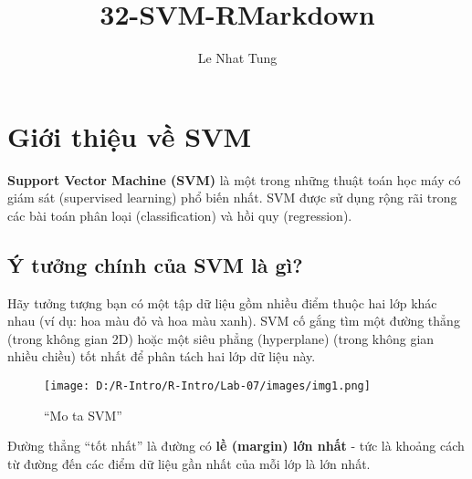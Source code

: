 \documentclass[
]{article}
\title{32-SVM-RMarkdown}
\author{Le Nhat Tung}
\date{}
\begin{document}
\maketitle

\section{Giới thiệu về SVM}\label{giux1edbi-thiux1ec7u-vux1ec1-svm}

\textbf{Support Vector Machine (SVM)} là một trong những thuật toán học
máy có giám sát (supervised learning) phổ biến nhất. SVM được sử dụng
rộng rãi trong các bài toán phân loại (classification) và hồi quy
(regression).

\subsection{Ý tưởng chính của SVM là
gì?}\label{uxfd-tux1b0ux1edfng-chuxednh-cux1ee7a-svm-luxe0-guxec}

Hãy tưởng tượng bạn có một tập dữ liệu gồm nhiều điểm thuộc hai lớp khác
nhau (ví dụ: hoa màu đỏ và hoa màu xanh). SVM cố gắng tìm một đường
thẳng (trong không gian 2D) hoặc một siêu phẳng (hyperplane) (trong
không gian nhiều chiều) tốt nhất để phân tách hai lớp dữ liệu này.

\begin{figure}
\centering
\texttt{[image: D:/R-Intro/R-Intro/Lab-07/images/img1.png]}
\caption{``Mo ta SVM''}
\end{figure}

Đường thẳng ``tốt nhất'' là đường có \textbf{lề (margin) lớn nhất} - tức
là khoảng cách từ đường đến các điểm dữ liệu gần nhất của mỗi lớp là lớn
nhất.
\end{document}
